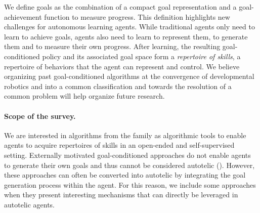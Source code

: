 We define goals as the combination of a compact goal representation and a goal-achievement function to measure progress. This definition highlights new challenges for autonomous learning agents. While traditional \rl agents only need to learn to achieve goals, \rlimgep agents also need to learn to represent them, to generate them and to measure their own
progress. After learning, the resulting goal-conditioned policy and its associated goal space form a \textit{repertoire of skills}, a repertoire of behaviors that the agent can represent and control. We believe organizing past goal-conditioned \rl algorithms at the convergence of developmental robotics and \rl into a common classification and towards the resolution of a common problem will help organize future research.





\paragraph{Scope of the survey.}
We are interested in algorithms from the \rlimgep family as algorithmic tools to enable agents to acquire repertoires of skills in an open-ended and self-supervised setting. Externally motivated goal-conditioned \rl approaches do not enable agents to generate their own goals and thus cannot be considered autotelic (\imgeps). However, these approaches can often be converted into autotelic \rlimgeps by integrating the goal generation process within the agent. For this reason, we include some \rlemgeps approaches when they present interesting mechanisms that can directly be leveraged in autotelic agents. 

